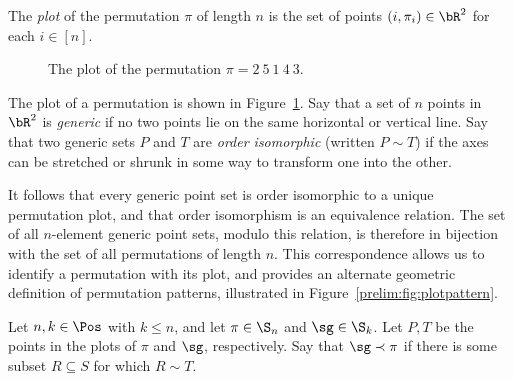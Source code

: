 \documentclass[12pt,twoside]{memoir}
\begin{document}
      \begin{definition} \label{prelim:def:permplot}
        The \emph{plot} of the permutation $\pi$ of length $n$ is
        the set of points $(i, \pi_i) \in \bR^2$ for each $i \in [n]$. 
      \end{definition}

      \begin{figure}[t]\centering 
        \caption{The plot of the permutation $\pi = 2\ 5\ 1\ 4\ 3$.}
        \label{prelim:fig:plot}
      \end{figure}

      The plot of a permutation is shown in Figure~\ref{prelim:fig:plot}. 
      Say that a set of $n$ points in $\bR^2$ is \emph{generic} if no two points
      lie on the same horizontal or vertical line. 
      Say that two generic sets $P$ and $T$ are \emph{order isomorphic} (written
      $P \sim T$) if the axes can be stretched or shrunk in some way to transform
      one into the other. 
      
      It follows that every generic point set is order isomorphic to
      a unique permutation plot, and that order isomorphism is an equivalence
      relation.
      The set of all $n$-element generic point sets, modulo this relation, is
      therefore in bijection with the set of all permutations of length $n$. This
      correspondence allows us to identify a permutation with its plot, and
      provides an alternate geometric definition of permutation patterns,
      illustrated in Figure~\ref{prelim:fig:plotpattern}.

      \begin{definition} 
        Let $n,k \in \Pos$ with $k \leq n$, and let $\pi \in \S_n$ and $\sg \in
        \S_k$. Let $P, T$ be the points in the plots of $\pi$ and $\sg$,
        respectively. Say that $\sg \prec \pi$ if there is some subset $R
        \subseteq S$ for which $R \sim T$. 
      \end{definition}
\end{document}
